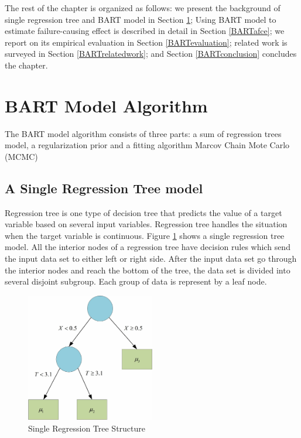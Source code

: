 The rest of the chapter is organized as follows: we present the background of single regression tree and BART model in Section \ref{BARTbg}; Using BART model to estimate failure-causing effect is described in detail in Section \ref{BARTafce};  we report on its empirical evaluation in Section \ref{BARTevaluation}; related work is surveyed in Section \ref{BARTrelatedwork}; and Section \ref{BARTconclusion} concludes the chapter.

\section{BART Model Algorithm}\label{BARTbg}%
The BART model algorithm consists of three parts: a sum of regression trees model, a regularization prior and a fitting algorithm Marcov Chain Mote Carlo (MCMC)
\subsection{A Single Regression Tree model}\label{IIIA}
Regression tree is one type of decision tree that predicts the value of a target variable based on several input variables. Regression tree handles the situation when the target variable is continuous. Figure \ref{singlergt} shows a single regression tree model. All the interior nodes of a regression tree have decision rules which send the input data set to either left or right side. After the input data set go through the interior nodes and reach the bottom of the tree, the data set is divided into several disjoint subgroup. Each group of data is represent by a leaf node.

\begin{figure}[!thpb]
\centering
\includegraphics[width=0.5\textwidth]{chapter4_SingleRGT.pdf}
\caption{Single Regression Tree Structure}
\label{singlergt}
\end{figure}

